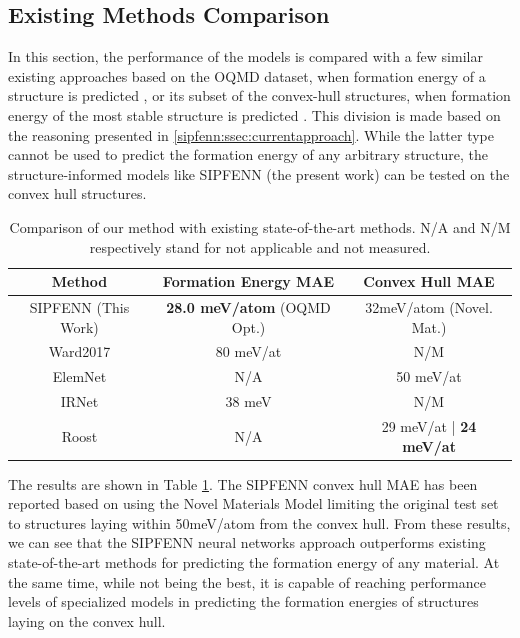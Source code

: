 \subsection{Existing Methods Comparison} \label{sipfenn:ssec:existing}
In this section, the performance of the models is compared with a few similar existing approaches based on the OQMD dataset, when formation energy of a structure is predicted \cite{Ward2016AMaterials, Ward2017IncludingTessellations, Jha2019IRNet}, or its subset of the convex-hull structures, when formation energy of the most stable structure is predicted \cite{Jha2018ElemNet:Composition, Goodall2020PredictingStoichiometry}.  This division is made based on the reasoning presented in \ref{sipfenn:ssec:currentapproach}. While the latter type cannot be used to predict the formation energy of any arbitrary structure, the structure-informed models like SIPFENN (the present work) can be tested on the convex hull structures. 


\begin{table}[H]
\begin{center}
\begin{tabular}{|c|c|c|}
\hline
 Method & Formation Energy MAE & Convex Hull MAE \\
 \hline
 SIPFENN (This Work) & \textbf{28.0 meV/atom} (OQMD Opt.) & 32meV/atom (Novel. Mat.) \\
 Ward2017 \cite{Ward2016AMaterials, Ward2017IncludingTessellations} & 80 meV/at & N/M \\
 ElemNet \cite{Jha2018ElemNet:Composition} & N/A & 50 meV/at\\  
 IRNet \cite{Jha2019IRNet} & 38 meV & N/M \\
 Roost \cite{Goodall2020PredictingStoichiometry} & N/A & 29 meV/at | \textbf{24 meV/at}\\
 \hline
\end{tabular}
\caption{Comparison of our method with existing state-of-the-art methods. N/A and N/M respectively stand for not applicable and not measured.}
\label{sipfenn:comparison-results}
\end{center}
\vspace{-24pt}
\end{table}

The results are shown in Table \ref{sipfenn:comparison-results}. The SIPFENN convex hull MAE has been reported based on using the Novel Materials Model limiting the original test set to structures laying within 50meV/atom from the convex hull. From these results, we can see that the SIPFENN neural networks approach outperforms existing state-of-the-art methods for predicting the formation energy of any material. At the same time, while not being the best, it is capable of reaching performance levels of specialized models in predicting the formation energies of structures laying on the convex hull.

